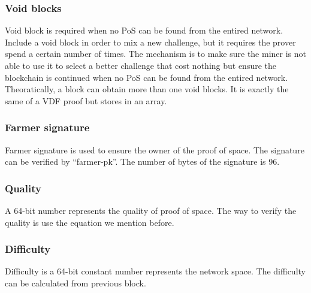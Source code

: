 \subsubsection{Void blocks}
\begin{flushleft}
    Void block is required when no PoS can be found from the entired network. Include a void block in order to mix a new challenge, but it requires the prover spend a certain number of times. The mechanism is to make sure the miner is not able to use it to select a better challenge that cost nothing but ensure the blockchain is continued when no PoS can be found from the entired network. Theoratically, a block can obtain more than one void blocks. It is exactly the same of a VDF proof but stores in an array.
\end{flushleft}
\subsubsection{Farmer signature}
\begin{flushleft}
    Farmer signature is used to ensure the owner of the proof of space. The signature can be verified by ``farmer-pk''. The number of bytes of the signature is 96.
\end{flushleft}
\subsubsection{Quality}
\begin{flushleft}
    A 64-bit number represents the quality of proof of space. The way to verify the quality is use the equation we mention before.
\end{flushleft}
\subsubsection{Difficulty}
\begin{flushleft}
    Difficulty is a 64-bit constant number represents the network space. The difficulty can be calculated from previous block.
\end{flushleft}
